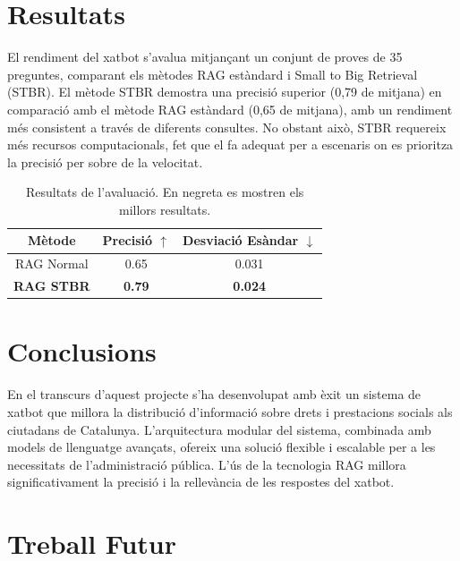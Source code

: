 \documentclass[a4paper,12pt,oneside]{ThesisStyle}
\begin{document}
\section{Resultats}
\label{sec:results}

El rendiment del xatbot s'avalua mitjançant un conjunt de proves de 35 preguntes, comparant els mètodes RAG estàndard i Small to Big Retrieval (STBR). El mètode STBR demostra una precisió superior (0,79 de mitjana) en comparació amb el mètode RAG estàndard (0,65 de mitjana), amb un rendiment més consistent a través de diferents consultes. No obstant això, STBR requereix més recursos computacionals, fet que el fa adequat per a escenaris on es prioritza la precisió per sobre de la velocitat.

\begin{table}[H]
  \centering
  \begin{tabular}{|c|c|c|}
    \hline
    \textbf{Mètode}          & \textbf{Precisió \(\uparrow\)} & \textbf{Desviació Esàndar \(\downarrow\)}  \\
    \hline
    RAG Normal               & 0.65                           & 0.031                                      \\
    \textbf{RAG STBR}        & \textbf{0.79}                  & \textbf{0.024}                             \\       
    \hline
  \end{tabular}
  \caption{Resultats de l'avaluació. En negreta es mostren els millors resultats.}
  \label{tab:benchmark_results}
\end{table}

\section{Conclusions}
\label{sec:conclusions}

En el transcurs d'aquest projecte s'ha desenvolupat amb èxit un sistema de xatbot que millora la distribució d'informació sobre drets i prestacions socials als ciutadans de Catalunya. L'arquitectura modular del sistema, combinada amb models de llenguatge avançats, ofereix una solució flexible i escalable per a les necessitats de l'administració pública. L'ús de la tecnologia RAG millora significativament la precisió i la rellevància de les respostes del xatbot.

\section{Treball Futur}
\label{sec:future_work}
\end{document}
